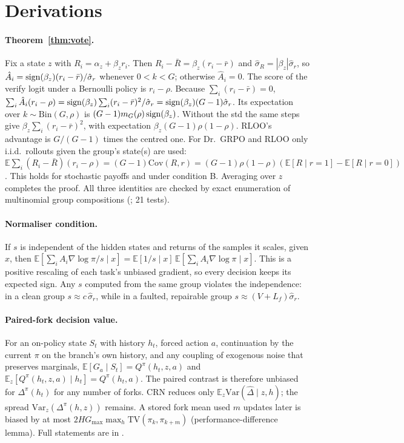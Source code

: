 \section{Derivations}\label{app2:proofs}

\paragraph{Theorem~\ref{thm:vote}.} Fix a state $z$ with $R_i=\alpha_z+\beta_z r_i$. Then
$R_i-\bar R=\beta_z(r_i-\bar r)$ and $\hat\sigma_R=|\beta_z|\hat\sigma_r$, so
$\hat A_i=\operatorname{sign}(\beta_z)(r_i-\bar r)/\hat\sigma_r$ whenever $0<k<G$; otherwise $\hat A_i=0$. The score of the verify
logit under a Bernoulli policy is $r_i-\rho$. Because $\sum_i(r_i-\bar r)=0$,
$\sum_i\hat A_i(r_i-\rho)=\operatorname{sign}(\beta_z)\sum_i(r_i-\bar r)^2/\hat\sigma_r=\operatorname{sign}(\beta_z)(G-1)\hat\sigma_r$.
Its expectation over $k\sim\mathrm{Bin}(G,\rho)$ is $(G-1)m_G(\rho)\operatorname{sign}(\beta_z)$. Without the std the same steps give
$\beta_z\sum_i(r_i-\bar r)^2$, with expectation $\beta_z(G-1)\rho(1-\rho)$. RLOO's advantage is $G/(G-1)$ times the
centred one. For Dr.~GRPO and RLOO only i.i.d.\ rollouts given the group's state(s) are used:
$\mathbb E\sum_i(R_i-\bar R)(r_i-\rho)=(G-1)\mathrm{Cov}(R,r)=(G-1)\rho(1-\rho)(\mathbb E[R\mid r{=}1]-\mathbb E[R\mid r{=}0])$.
This holds for stochastic payoffs and under condition B. Averaging over $z$ completes the proof. All three
identities are checked by exact enumeration of multinomial group compositions
(; 21 tests).

\paragraph{Normaliser condition.} If $s$ is independent of the hidden states and returns of the samples it scales,
given $x$, then $\mathbb E[\sum_iA_i\nabla\log\pi/s\mid x]=\mathbb E[1/s\mid x]\,\mathbb E[\sum_iA_i\nabla\log\pi\mid x]$.
This is a positive rescaling of each task's unbiased gradient, so every decision keeps its expected sign. Any $s$
computed from the same group violates the independence: in a clean group $s\approx c\,\hat\sigma_r$, while in a
faulted, repairable group $s\approx(V+L_f)\hat\sigma_r$.

\paragraph{Paired-fork decision value.} For an on-policy state $S_t$ with history $h_t$, forced action $a$,
continuation by the current $\pi$ on the branch's own history, and any coupling of exogenous noise that preserves
marginals,
$\mathbb E[G_a\mid S_t]=Q^\pi(h_t,z,a)$ and $\mathbb E_z[Q^\pi(h_t,z,a)\mid h_t]=Q^\pi(h_t,a)$. The paired contrast is
therefore unbiased for $\Delta^\pi(h_t)$ for any number of forks. CRN reduces only
$\mathbb E_z\mathrm{Var}(\hat\Delta\mid z,h)$; the spread $\mathrm{Var}_z(\Delta^\pi(h,z))$ remains. A stored fork mean
used $m$ updates later is biased by at most $2HG_{\max}\max_h\mathrm{TV}(\pi_k,\pi_{k+m})$ (performance-difference
lemma). Full statements are in .

